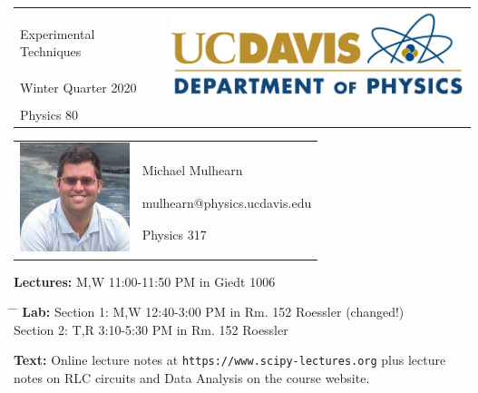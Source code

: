 \documentclass[12pt]{article}
\begin{document}
\begin{tabular*}{\textwidth}{l @{\extracolsep{\fill}} r}
  & \multirow{3}{*}{\includegraphics[height=1.0in]{logo.jpg}} \\
  \large Experimental Techniques & \\
  \large Winter Quarter 2020 & \\
  \large Physics 80 & \\
\end{tabular*}
\vspace{10mm}

\begin{tabular}{ l l }
  \multirow{6}{*}{\includegraphics[height=1.25in]{mike.jpg}} & \\
  & \\
  & \large Michael Mulhearn \\
  & \large mulhearn@physics.ucdavis.edu \\
  & \large Physics 317 \\
  & \\
\end{tabular}
\vskip 0.5cm
\noindent
\textbf {Lectures:} M,W 11:00-11:50 PM in Giedt 1006
\begin{tabbing}
\hspace*{3em}\= \hspace*{5em} \= \kill %
\textbf {Lab:}    \> Section 1: \> M,W 12:40-3:00 PM in Rm. 152 Roessler (changed!)\\
                  \> Section 2: \> T,R 3:10-5:30 PM in Rm. 152 Roessler \\
\end{tabbing}


\noindent
\textbf {Text:}  Online lecture notes at {\tt https://www.scipy-lectures.org} plus
lecture notes on RLC circuits and Data Analysis on the course website. \\
\end{document}
